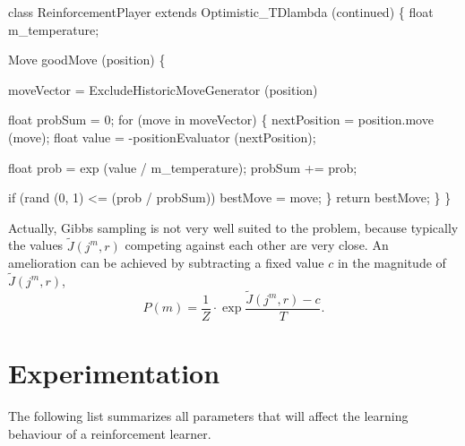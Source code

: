 \begin{algorithm} \label{al:annealing}
class ReinforcementPlayer extends Optimistic_TDlambda (continued)
\{
  float m_temperature; 

  Move goodMove (position)
  \{

    moveVector = ExcludeHistoricMoveGenerator (position) 

    float probSum = 0;
    for (move in moveVector) 
    \{
      nextPosition = position.move (move);       
      float value = -positionEvaluator (nextPosition); 

      float prob = exp (value / m_temperature);
      probSum += prob;
    
      if (rand (0, 1) <= (prob / probSum)) bestMove = move;
    \}
    return bestMove;   
  \}
\}
\end{algorithm}

Actually, Gibbs sampling is not very well suited to the problem, because typically the values $\tilde J(j^m,r)$ competing against each other are very close. An amelioration can be achieved by subtracting a fixed value $c$ in the magnitude of $\tilde J(j^m,r)$,
$$P(m) = \frac{1}{Z} \cdot \exp\frac{\tilde J(j^m,r)-c}{T}.$$





\section{Experimentation} \label{sec:neuro:experim}
The following list summarizes all parameters that will affect the learning behaviour of a reinforcement learner.

